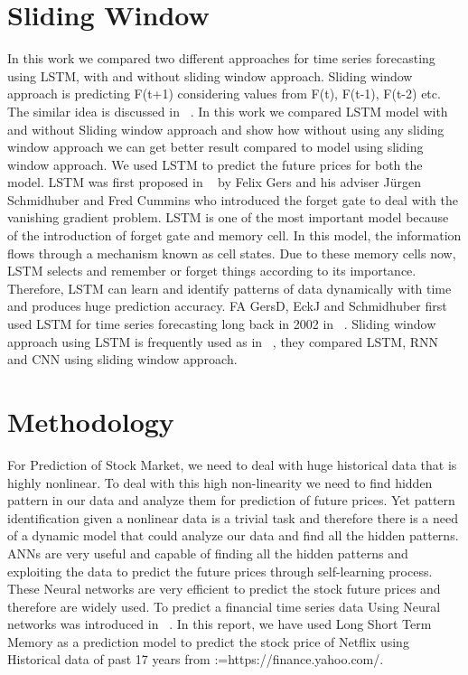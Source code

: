 \documentclass[5p,,preprint,12pt,twocolumn]{elsarticle}
\makeatletter
\def\BreakURLText#1{\@tfor\brk@tempa:=#1\do{\brk@tempa\hskip0pt}}
\makeatother
\begin{document}
\section{Sliding Window}
In this work we compared two different approaches for time series forecasting using LSTM, with and without sliding window approach. Sliding window approach is predicting F(t+1) considering values from F(t), F(t-1), F(t-2) etc. The similar idea is discussed in \unskip~\cite{490201:11080527}. In this work we compared LSTM model with and without Sliding window approach and show how without using any sliding window approach we can get better result compared to model using sliding window approach. We used LSTM to predict the future prices for both the model. LSTM was first proposed in \unskip~\cite{490201:11043817} by Felix Gers and his adviser J{\"{u}}rgen Schmidhuber and Fred Cummins who introduced the forget gate to deal with the vanishing gradient problem. LSTM is one of the most important model because of the introduction of forget gate and memory cell. In this model, the information flows through a mechanism known as cell states. Due to these memory cells now, LSTM selects and remember or forget things according to its importance. Therefore, LSTM can learn and identify patterns of data dynamically with time and produces huge prediction accuracy.  FA GersD, EckJ and Schmidhuber first used LSTM for time series forecasting long back in 2002 in \unskip~\cite{490201:11043818}. Sliding window approach using LSTM is frequently used as in \unskip~\cite{490201:11080703}, they compared LSTM, RNN and CNN using sliding window approach. 
    
\section{Methodology}
For Prediction of Stock Market, we need to deal with huge historical data that is highly nonlinear. To deal with this high non-linearity we need to find hidden pattern in our data and analyze them for prediction of future prices. Yet pattern identification given a nonlinear data is a trivial task and therefore there is a need of a dynamic model that could analyze our data and find all the hidden patterns. ANNs are very useful and capable of finding all the hidden patterns and exploiting the data to predict the future prices through self-learning process. These Neural networks are very efficient to predict the stock future prices and therefore are widely used. To predict a financial time series data Using Neural networks was introduced in \unskip~\cite{490201:11043819}. In this report, we have used Long Short Term Memory as a prediction model to predict the stock price of Netflix using Historical data of past 17 years from \BreakURLText{https://finance.yahoo.com/.}
\end{document}
